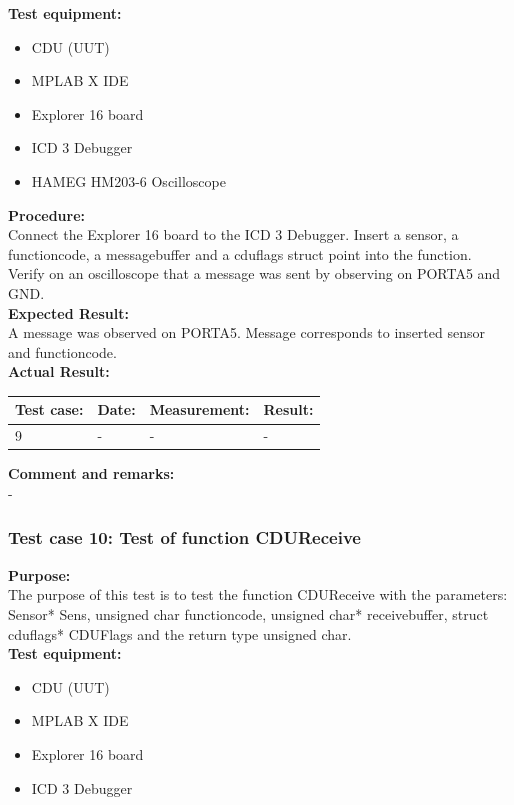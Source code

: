 \textbf{Test equipment:}
\begin{itemize}
\item CDU (UUT)
\item MPLAB X IDE
\item Explorer 16 board
\item ICD 3 Debugger
\item HAMEG HM203-6 Oscilloscope
\end{itemize}

\textbf{Procedure:}\\
Connect the Explorer 16 board to the ICD 3 Debugger. Insert a sensor, a functioncode, a messagebuffer and a cduflags struct point into the function. Verify on an oscilloscope that a message was sent by observing on PORTA5 and GND.\\

\textbf{Expected Result:}\\
A message was observed on PORTA5. Message corresponds to inserted sensor and functioncode.\\

\textbf{Actual Result:}\\
\begin{table}[H]
\centering
\begin{tabular}{|p{2cm}|p{2cm}|p{3cm}|p{2cm}|}\hline
\textbf{Test case:} & \textbf{Date:} & \textbf{Measurement:} & \textbf{Result:} \\ \hline
9 & - & - & - \\ \hline
\end{tabular}
\end{table}

\textbf{Comment and remarks:}\\
-\\

\subsubsection{Test case 10: Test of function CDUReceive }
\textbf{Purpose:}\\
The purpose of this test is to test the function CDUReceive with the parameters: Sensor* Sens, unsigned char functioncode, unsigned char* receivebuffer, struct cduflags* CDUFlags and the return type unsigned char.\\

\textbf{Test equipment:}
\begin{itemize}
\item CDU (UUT)
\item MPLAB X IDE
\item Explorer 16 board
\item ICD 3 Debugger
\end{itemize}

